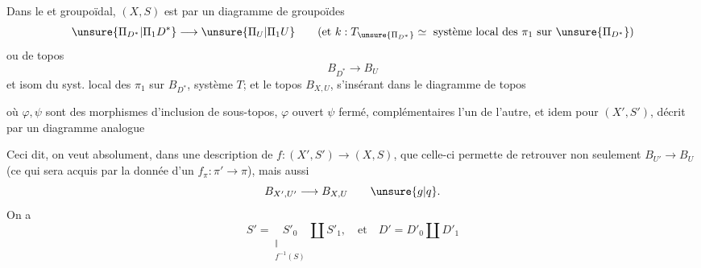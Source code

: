 Dans le    et groupoïdal, $(X,S)$ est   par un diagramme de groupoïdes
\[
\unsure{\Pi_{D^*}|\Pi_1 D^*}\longrightarrow\unsure{\Pi_U|\Pi_1 U}
\qquad
(\text{et }k:T_{\unsure{\Pi_{D^*}}}\simeq
\text{ système local des }\pi_1\text{ sur }\unsure{\Pi_{D^*}})
\]
ou de topos
\[
B_{D^*}\longrightarrow B_U
\]
et  isom  du syst. local des $\pi_1$ sur $B_{D^*}$,  système   $T$;
et le topos $B_{X,U}$, s'insérant dans le diagramme  de topos


où $\varphi,\psi$ sont des morphismes d'inclusion de sous-topos, $\varphi$ ouvert $\psi$ fermé, complémentaires l'un de l'autre, et idem pour $(X',S')$, décrit par un diagramme analogue

Ceci dit, on veut absolument, dans une description de
$f:(X',S')\longrightarrow(X,S)$, que celle-ci permette de retrouver non seulement $B_{U'}\longrightarrow B_U$ (ce qui sera acquis par la donnée d'un $f_\pi:\pi'\longrightarrow\pi$), mais aussi
\[
B_{X',U'}\longrightarrow B_{X,U}\qquad\unsure{g|q}.
\]
On a 
\[
S'=\underset{\substack{\Vert\\f^{-1}(S)}}{S'_0}\amalg S'_1,
\quad\text{et}\quad D'=D'_0\amalg D'_1
\]



